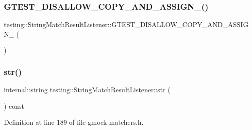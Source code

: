 \subsubsection{\texorpdfstring{G\+T\+E\+S\+T\+\_\+\+D\+I\+S\+A\+L\+L\+O\+W\+\_\+\+C\+O\+P\+Y\+\_\+\+A\+N\+D\+\_\+\+A\+S\+S\+I\+G\+N\+\_\+()}{GTEST\_DISALLOW\_COPY\_AND\_ASSIGN\_()}}
{\footnotesize\ttfamily testing\+::\+String\+Match\+Result\+Listener\+::\+G\+T\+E\+S\+T\+\_\+\+D\+I\+S\+A\+L\+L\+O\+W\+\_\+\+C\+O\+P\+Y\+\_\+\+A\+N\+D\+\_\+\+A\+S\+S\+I\+G\+N\+\_\+ (\begin{DoxyParamCaption}\item[{\hyperlink{classtesting_1_1StringMatchResultListener}{String\+Match\+Result\+Listener}}]{ }\end{DoxyParamCaption})\hspace{0.3cm}{\ttfamily [private]}}

\mbox{\label{classtesting_1_1StringMatchResultListener_ad1ed3c6b1077cc76b67567b33f5a2bd1}} 
\subsubsection{\texorpdfstring{str()}{str()}}
{\footnotesize\ttfamily \hyperlink{namespacetesting_1_1internal_a8e8ff5b11e64078831112677156cb111}{internal\+::string} testing\+::\+String\+Match\+Result\+Listener\+::str (\begin{DoxyParamCaption}{ }\end{DoxyParamCaption}) const\hspace{0.3cm}{\ttfamily [inline]}}



Definition at line 189 of file gmock-\/matchers.\+h.



